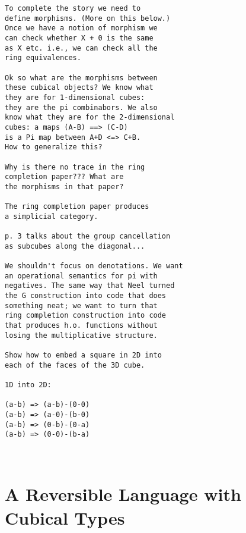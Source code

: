 \documentclass[authoryear,preprint]{sigplanconf}
\begin{document}
\begin{verbatim}
To complete the story we need to 
define morphisms. (More on this below.)
Once we have a notion of morphism we 
can check whether X + 0 is the same
as X etc. i.e., we can check all the 
ring equivalences. 

Ok so what are the morphisms between 
these cubical objects? We know what
they are for 1-dimensional cubes: 
they are the pi combinabors. We also
know what they are for the 2-dimensional 
cubes: a maps (A-B) ==> (C-D) 
is a Pi map between A+D <=> C+B. 
How to generalize this? 

Why is there no trace in the ring 
completion paper??? What are 
the morphisms in that paper?

The ring completion paper produces
a simplicial category.

p. 3 talks about the group cancellation
as subcubes along the diagonal... 

We shouldn't focus on denotations. We want
an operational semantics for pi with 
negatives. The same way that Neel turned
the G construction into code that does
something neat; we want to turn that 
ring completion construction into code
that produces h.o. functions without
losing the multiplicative structure.

Show how to embed a square in 2D into
each of the faces of the 3D cube.

1D into 2D:

(a-b) => (a-b)-(0-0)
(a-b) => (a-0)-(b-0)
(a-b) => (0-b)-(0-a)
(a-b) => (0-0)-(b-a)



\end{verbatim}

\section{A Reversible Language with Cubical Types} 
\end{document}
